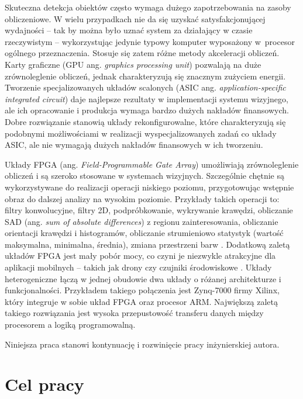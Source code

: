 Skuteczna detekcja obiektów często wymaga dużego zapotrzebowania na zasoby obliczeniowe. 
W wielu przypadkach nie da się uzyskać satysfakcjonującej wydajności -- tak by można było uznać system za działający w czasie rzeczywistym -- wykorzystując jedynie typowy komputer wyposażony w~procesor ogólnego przeznaczenia. 
Stosuje się zatem różne metody akceleracji obliczeń. 
Karty graficzne (GPU ang. \textit{graphics processing unit}) pozwalają na duże zrównoleglenie obliczeń, jednak charakteryzują się znacznym zużyciem energii. %
Tworzenie specjalizowanych układów scalonych (ASIC ang. \textit{application-specific integrated circuit}) daje najlepsze rezultaty w implementacji systemu wizyjnego, ale ich opracowanie i produkcja wymaga bardzo dużych nakładów finansowych. %
Dobre rozwiązanie stanowią układy rekonfigurowalne, które charakteryzują się podobnymi możliwościami w realizacji wyspecjalizowanych zadań co układy ASIC, ale nie wymagają dużych nakładów finansowych w ich tworzeniu. %

Układy FPGA (ang. \textit{Field-Programmable Gate Array}) umożliwiają zrównoleglenie obliczeń i są szeroko stosowane w systemach wizyjnych. 
Szczególnie chętnie są wykorzystywane do realizacji operacji niskiego poziomu, przygotowując wstępnie obraz do dalszej analizy na wysokim poziomie. 
Przykłady takich operacji to: filtry konwolucyjne, filtry 2D, podpróbkowanie, wykrywanie krawędzi, obliczanie SAD (ang. \textit{sum of absolute differences}) z regionu zainteresowania, obliczanie orientacji krawędzi i histogramów, obliczanie strumieniowo statystyk (wartość maksymalna, minimalna, średnia), zmiana przestrzeni barw \cite{kisacanin2008embedded}. %
Dodatkową zaletą układów FPGA jest mały pobór mocy, co czyni je niezwykle atrakcyjne dla aplikacji mobilnych -- takich jak drony czy czujniki środowiskowe \cite{garcia2014survey}. 
Układy heterogeniczne łączą w jednej obudowie dwa układy o różanej architekturze i funkcjonalności. 
Przykładem takiego połączenia jest Zynq-7000 firmy Xilinx, który integruje w sobie układ FPGA oraz procesor ARM. 
Największą zaletą takiego rozwiązania jest wysoka przepustowość transferu danych między procesorem a logiką programowalną. 

Niniejsza praca stanowi kontynuację i rozwinięcie pracy inżynierskiej autora.

\section{Cel pracy}

